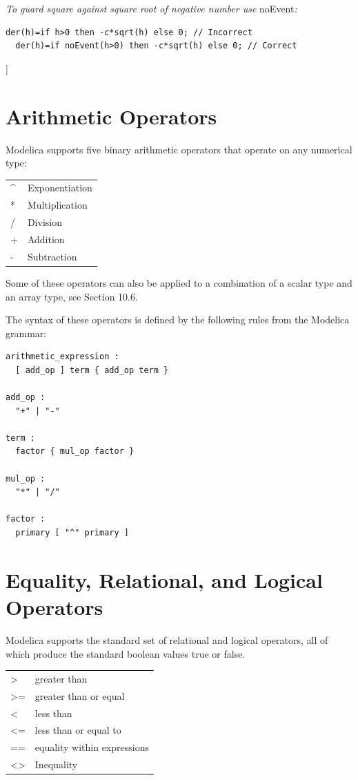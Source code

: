 \documentclass[10pt,a4paper]{report}
\def\doublelabel#1{\label{#1}\hypertarget{#1}{}}
\begin{document}
\emph{To guard square against square root of negative number use}
noEvent\emph{:}
\begin{lstlisting}[language=modelica]
  der(h)=if h>0 then -c*sqrt(h) else 0; // Incorrect
  der(h)=if noEvent(h>0) then -c*sqrt(h) else 0; // Correct
\end{lstlisting}

{]}

\section{Arithmetic Operators}

Modelica supports five binary arithmetic operators that operate on any
numerical type:

\begin{longtable}[c]{@{}ll@{}}

\^{} & Exponentiation\tabularnewline
* & Multiplication\tabularnewline
/ & Division\tabularnewline
+ & Addition\tabularnewline
- & Subtraction\tabularnewline

\end{longtable}

Some of these operators can also be applied to a combination of a scalar
type and an array type, see Section 10.6.

The syntax of these operators is defined by the following rules from the
Modelica grammar:
\begin{lstlisting}[language=grammar]
arithmetic_expression : 
  [ add_op ] term { add_op term }
  
add_op : 
  "+" | "-"
  
term :  
  factor { mul_op factor }
  
mul_op : 
  "*" | "/"
  
factor : 
  primary [ "^" primary ] 
\end{lstlisting}

\section{Equality, Relational, and Logical Operators}\doublelabel{equality-relational-and-logical-operators}

Modelica supports the standard set of relational and logical operators,
all of which produce the standard boolean values true or false.

\begin{longtable}[c]{@{}ll@{}}

\textgreater{} & greater than\tabularnewline
\textgreater{}= & greater than or equal\tabularnewline
\textless{} & less than\tabularnewline
\textless{}= & less than or equal to\tabularnewline
== & equality within expressions\tabularnewline
\textless{}\textgreater{} & Inequality\tabularnewline

\end{longtable}
\end{document}
